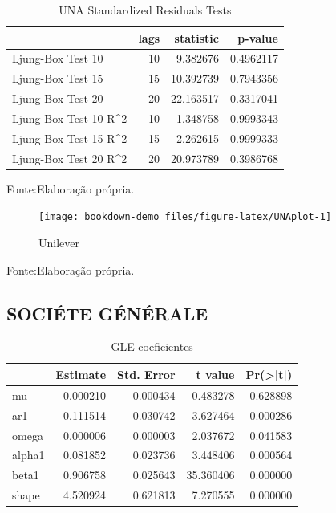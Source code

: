 \documentclass[
  12pt,
  a4paper,
  openany]{book}
\begin{document}
\begin{table}[!h]

\caption{\label{tab:unnamed-chunk-18}UNA Standardized Residuals Tests}
\centering
\begin{tabular}[t]{lrrr}
\toprule
  & lags & statistic & p-value\\
\midrule
Ljung-Box Test 10 & 10 & 9.382676 & 0.4962117\\
Ljung-Box Test 15 & 15 & 10.392739 & 0.7943356\\
Ljung-Box Test 20 & 20 & 22.163517 & 0.3317041\\
Ljung-Box Test 10 R\textasciicircum{}2 & 10 & 1.348758 & 0.9993343\\
Ljung-Box Test 15 R\textasciicircum{}2 & 15 & 2.262615 & 0.9999333\\
\addlinespace
Ljung-Box Test 20 R\textasciicircum{}2 & 20 & 20.973789 & 0.3986768\\
\bottomrule
\end{tabular}
\end{table}
\FloatBarrier
\centering

Fonte:Elaboração própria.

\justifying
\bigskip
\begin{figure}

{\centering \texttt{[image: bookdown-demo\_files/figure-latex/UNAplot-1]} 

}

\caption{Unilever}\label{fig:UNAplot}
\end{figure}
\FloatBarrier
\centering

Fonte:Elaboração própria.

\justifying
\bigskip

\hypertarget{sociuxe9te-guxe9nuxe9rale}{%
\subsection{SOCIÉTE GÉNÉRALE}\label{sociuxe9te-guxe9nuxe9rale}}

\begin{table}[!h]

\caption{\label{tab:unnamed-chunk-20}GLE coeficientes}
\centering
\begin{tabular}[t]{lrrrr}
\toprule
  &  Estimate &  Std. Error &  t value & Pr(>|t|)\\
\midrule
mu & -0.000210 & 0.000434 & -0.483278 & 0.628898\\
ar1 & 0.111514 & 0.030742 & 3.627464 & 0.000286\\
omega & 0.000006 & 0.000003 & 2.037672 & 0.041583\\
alpha1 & 0.081852 & 0.023736 & 3.448406 & 0.000564\\
beta1 & 0.906758 & 0.025643 & 35.360406 & 0.000000\\
\addlinespace
shape & 4.520924 & 0.621813 & 7.270555 & 0.000000\\
\bottomrule
\end{tabular}
\end{table}
\FloatBarrier
\centering
\end{document}
